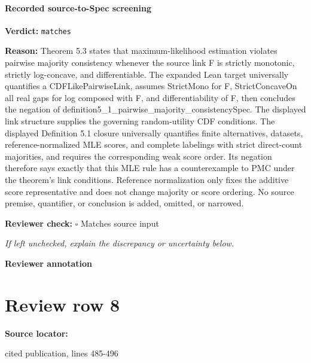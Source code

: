 \documentclass[10pt]{article}
\newcommand{\reviewerbox}{%
  \par\noindent\fbox{\parbox{0.96\linewidth}{\rule{0pt}{0.38in}}}\par
}
\newcommand{\reviewmatch}[1]{%
  \par\noindent\textbf{Reviewer check:} $\square$\; #1\par
  \noindent\emph{If left unchecked, explain the discrepancy or uncertainty below.}\par
}
\begin{document}
\paragraph{Recorded source-to-Spec screening}
\textbf{Verdict:} \texttt{matches}
\\
{\raggedright
\textbf{Reason:} Theorem 5.\allowbreak{}3 states that maximum-\allowbreak{}likelihood estimation violates pairwise majority consistency whenever the source link F is strictly monotonic, strictly log-\allowbreak{}concave, and differentiable.\allowbreak{} The expanded Lean target universally quantifies a CDFLikePairwiseLink, assumes StrictMono for F, StrictConcaveOn all real gaps for log composed with F, and differentiability of F, then concludes the negation of definition5\_\allowbreak{}1\_\allowbreak{}pairwise\_\allowbreak{}majority\_\allowbreak{}consistencySpec.\allowbreak{} The displayed link structure supplies the governing random-\allowbreak{}utility CDF conditions.\allowbreak{} The displayed Definition 5.\allowbreak{}1 closure universally quantifies finite alternatives, datasets, reference-\allowbreak{}normalized MLE scores, and complete labelings with strict direct-\allowbreak{}count majorities, and requires the corresponding weak score order.\allowbreak{} Its negation therefore says exactly that this MLE rule has a counterexample to PMC under the theorem's link conditions.\allowbreak{} Reference normalization only fixes the additive score representative and does not change majority or score ordering.\allowbreak{} No source premise, quantifier, or conclusion is added, omitted, or narrowed.\allowbreak{}
\par}
\reviewmatch{Matches source input}
\noindent\textbf{Reviewer annotation}\par
\reviewerbox
\clearpage
\hypertarget{source-claim-04287088841a1f1c}{}
\section*{Review row 8}
\textbf{Source locator:} {\footnotesize\raggedright cited publication, lines 485-\allowbreak{}496\par}
\end{document}
